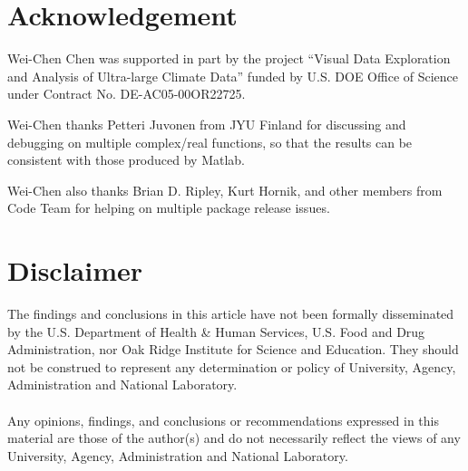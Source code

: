 
\section*{Acknowledgement}

Wei-Chen Chen was supported in part by the project
``Visual Data Exploration and Analysis of Ultra-large Climate Data''
funded by U.S. DOE Office of Science
under Contract No. DE-AC05-00OR22725.

Wei-Chen thanks Petteri Juvonen from JYU Finland
for discussing and debugging on multiple complex/real  functions,
so that the results can be consistent with those produced by
Matlab.

Wei-Chen also thanks Brian D. Ripley, Kurt Hornik, and other members from
 Code Team for helping on multiple package release issues.


\section*{Disclaimer}

The findings and conclusions in this article have not been
formally disseminated by the U.S. Department of Health \& Human Services,
U.S. Food and Drug Administration, nor Oak Ridge Institute for Science and
Education. They should not be construed to represent any determination or
policy of University, Agency, Administration and National Laboratory.
\\\\
Any  opinions,  findings,  and  conclusions  or  recommendations
expressed  in  this  material  are those  of  the  author(s)  and  do  not
 necessarily  reflect  the  views  of
any University, Agency, Administration and National Laboratory.

